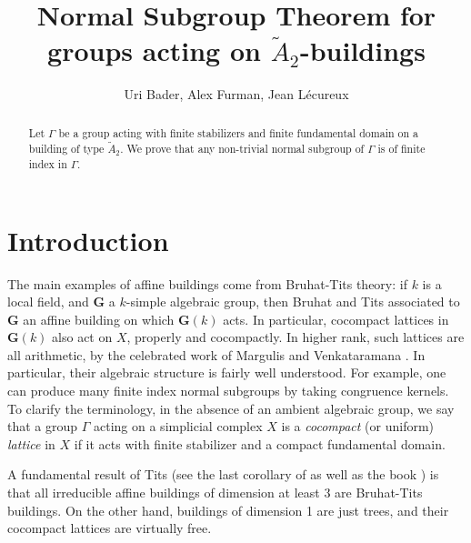 \documentclass[a4paper, 11pt]{article}
\theoremstyle{plain}
\theoremstyle{definition}
\theoremstyle{remark}
\begin{document}
\title{Normal Subgroup Theorem for groups acting on $\tilde A_2$-buildings}%

\author{Uri Bader, Alex Furman, Jean L\'ecureux}
\maketitle

\begin{abstract}
    Let $\Gamma$ be a group acting with finite stabilizers and finite fundamental domain on a building of type $\tilde A_2$. We prove that any non-trivial normal subgroup of $\Gamma$ is of finite index in $\Gamma$.
\end{abstract}

\tableofcontents



\section*{Introduction}

The main examples of affine buildings come from Bruhat-Tits theory: if $k$ is a local field, and $\mathbf G$ a $k$-simple algebraic group, then Bruhat and Tits associated to $\mathbf G$ an affine building on which $\mathbf G(k)$ acts. In particular, cocompact lattices in $\mathbf G(k)$ also act on $X$, properly and cocompactly. In higher rank, such lattices are all arithmetic, by  the celebrated work of Margulis and Venkataramana \cites{Margulis,Venka}. In particular, their algebraic structure is fairly well understood. For example, one can produce many finite index normal subgroups by taking congruence kernels. To clarify the terminology, in the absence of an ambient algebraic group, we say that a group $\Gamma$ acting on a simplicial complex $X$ is a \emph{cocompact} (or uniform) \emph{lattice} in $X$  if it acts with finite stabilizer and a compact fundamental domain.

A fundamental result of Tits (see the last corollary of \cite{Tits_cours84} as well as the book \cite{WeissBook}) is that all irreducible affine buildings of dimension at least 3 are Bruhat-Tits buildings. On the other hand, buildings of dimension 1 are just trees, and their cocompact lattices are virtually free.
\end{document}
